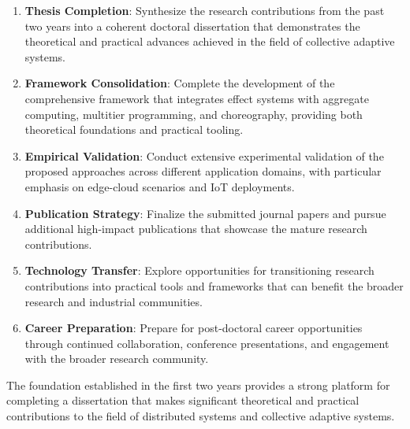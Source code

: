 \documentclass[runningheads]{llncs}
\begin{document}
\begin{enumerate}
\item \textbf{Thesis Completion}: Synthesize the research contributions from the past two years into a coherent doctoral dissertation that demonstrates the theoretical and practical advances achieved in the field of collective adaptive systems.

\item \textbf{Framework Consolidation}: Complete the development of the comprehensive framework that integrates effect systems with aggregate computing, multitier programming, and choreography, providing both theoretical foundations and practical tooling.

\item \textbf{Empirical Validation}: Conduct extensive experimental validation of the proposed approaches across different application domains, with particular emphasis on edge-cloud scenarios and IoT deployments.

\item \textbf{Publication Strategy}: Finalize the submitted journal papers and pursue additional high-impact publications that showcase the mature research contributions.

\item \textbf{Technology Transfer}: Explore opportunities for transitioning research contributions into practical tools and frameworks that can benefit the broader research and industrial communities.

\item \textbf{Career Preparation}: Prepare for post-doctoral career opportunities through continued collaboration, conference presentations, and engagement with the broader research community.
\end{enumerate}

The foundation established in the first two years provides a strong platform for completing a dissertation that makes significant theoretical and practical contributions to the field of distributed systems and collective adaptive systems.


%
%
%



\nocite{*}
\end{document}
